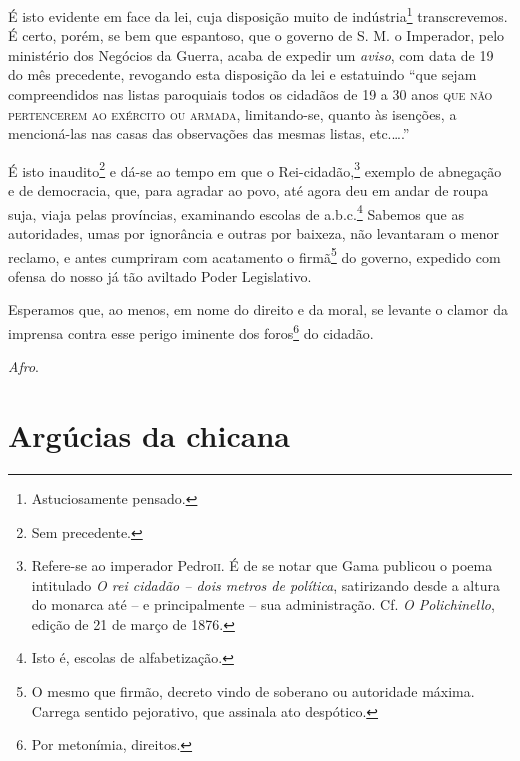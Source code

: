 É isto evidente em face da lei, cuja disposição muito de
indústria\footnote{ Astuciosamente pensado.} transcrevemos. É certo,
porém, se bem que espantoso, que o governo de S. M. o Imperador, pelo
ministério dos Negócios da Guerra, acaba de expedir um \emph{aviso}, com
data de 19 do mês precedente, revogando esta disposição da lei e
estatuindo ``que sejam compreendidos nas listas paroquiais todos os
cidadãos de 19 a 30 anos \textsc{que não pertencerem ao exército ou armada},
limitando-se, quanto às isenções, a mencioná-las nas casas das
observações das mesmas listas, etc.\ldots.''

É isto inaudito\footnote{ Sem precedente.} e dá-se ao tempo em que o
Rei-cidadão,\footnote{ Refere-se ao imperador Pedro\textsc{ii}. É de se notar
  que Gama publicou o poema intitulado \emph{O rei cidadão -- dois
  metros de política}, satirizando desde a altura do monarca até -- e
  principalmente -- sua administração. Cf. \emph{O Polichinello}, edição
  de 21 de março de 1876.} exemplo de abnegação e de democracia, que,
para agradar ao povo, até agora deu em andar de roupa suja, viaja pelas
províncias, examinando escolas de a.b.c.\footnote{ Isto é, escolas de
  alfabetização.} Sabemos que as autoridades, umas por ignorância e
outras por baixeza, não levantaram o menor reclamo, e antes cumpriram
com acatamento o firmã\footnote{ O mesmo que firmão, decreto vindo de
  soberano ou autoridade máxima. Carrega sentido pejorativo, que
  assinala ato despótico.} do governo, expedido com ofensa do nosso já
tão aviltado Poder Legislativo.

Esperamos que, ao menos, em nome do direito e da moral, se levante o
clamor da imprensa contra esse perigo iminente dos foros\footnote{ Por
  metonímia, direitos.} do cidadão.

\emph{Afro}.

\part{Argúcias da chicana}

